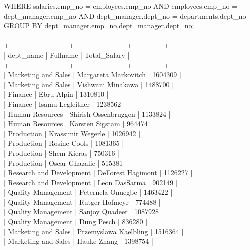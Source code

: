 \documentclass[]{article}
\begin{document}
\begin{enumerate}
WHERE salaries.emp\_no = employees.emp\_no
AND
employees.emp\_no = dept\_manager.emp\_no
AND
dept\_manager.dept\_no = departments.dept\_no
GROUP BY dept\_manager.emp\_no,dept\_manager.dept\_no;
\\\\
+--------------------------+-----------------------+--------------+
\\
| dept\_name                | Fullname              | Total\_Salary |
\\
+--------------------------+-----------------------+--------------+
\\
| Marketing and Sales      | Margareta Markovitch  |      1604309 |
\\
| Marketing and Sales      | Vishwani Minakawa     |      1488700 |
\\
| Finance                  | Ebru Alpin            |      1310810 |
\\
| Finance                  | Isamu Legleitner      |      1238562 |
\\
| Human Resources          | Shirish Ossenbruggen  |      1133824 |
\\
| Human Resources          | Karsten Sigstam       |       964474 |
\\
| Production               | Krassimir Wegerle     |      1026942 |
\\
| Production               | Rosine Cools          |      1081365 |
\\
| Production               | Shem Kieras           |       750316 |
\\
| Production               | Oscar Ghazalie        |       515381 |
\\
| Research and Development | DeForest Hagimont     |      1126227 |
\\
| Research and Development | Leon DasSarma         |       902149 |
\\
| Quality Management       | Peternela Onuegbe     |      1463422 |
\\
| Quality Management       | Rutger Hofmeyr        |       774488 |
\\
| Quality Management       | Sanjoy Quadeer        |      1087928 |
\\
| Quality Management       | Dung Pesch            |       836280 |
\\
| Marketing and Sales      | Przemyslawa Kaelbling |      1516364 |
\\
| Marketing and Sales      | Hauke Zhang           |      1398754 |
\\

\end{enumerate}
\end{document}

